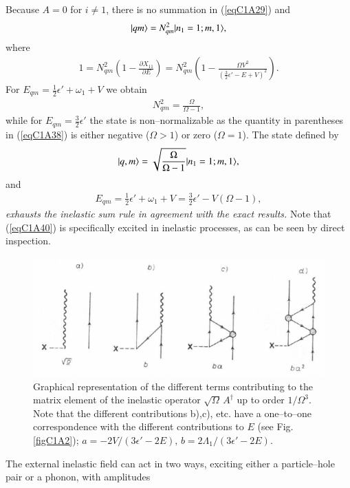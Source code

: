 Because $A=0$ for $i\neq 1$, there is no summation in (\ref{eqC1A29}) and
 \begin{align}\label{eqC1A37} 
|{qm} \rangle=N^2_{qm}|{n_1=1;m,1} \rangle,
 \end{align}
where
 \begin{align}\label{eqC1A38} 
1=N^2_{qm}\left(1-\frac{\partial X_{11}}{\partial E}\right)=N^2_{qm}\left(1-\frac{\Omega V^2}{\left(\frac{3}{2}\epsilon'-E+V\right)^2}\right).
 \end{align}
For $E_{qm}=\frac{1}{2}\epsilon'+\omega_1+V$ we obtain
 \begin{align}\label{eqC1A39} 
 N^2_{qm}=\frac{\Omega}{\Omega-1},
 \end{align}
while for $E_{qm}=\frac{3}{2}\epsilon'$ the state is non--normalizable as the quantity in parentheses
in (\ref{eqC1A38}) is either negative ($\Omega>1$) or zero ($\Omega=1$).
The state defined by
 \begin{align}\label{eqC1A40} 
|{q,m} \rangle=\sqrt{\frac{\Omega}{\Omega-1}}|{n_1=1;m,1} \rangle,
 \end{align}
and 
 \begin{align}\label{eqC1A41} 
E_{qm}=\frac{1}{2}\epsilon'+\omega_1+V=\frac{3}{2}\epsilon'-V(\Omega-1),
 \end{align}
\textit{exhausts the inelastic sum rule in agreement with the exact results.} Note
that (\ref{eqC1A40}) is specifically excited in inelastic processes, as can be seen by
direct inspection.
  \begin{figure}
  \centerline {
  \includegraphics*[width=12cm]{introduccion/figs/fig20}
  }
  \caption{Graphical representation of the different terms contributing to the matrix element of the inelastic operator $\sqrt{\Omega}\,A^\dagger$ up to order $1/\Omega^3$. Note that the different contributions b),c), etc. have a one--to--one correspondence with the different contributions to $E$ (see Fig. \ref{figC1A2}); $a=-2V/(3\epsilon'-2E),\,b=2\Lambda_1/(3\epsilon'-2E)$.}
  \label{figC1A3}
  \end{figure}
The external inelastic field can act in two ways, exciting either a particle--hole pair or a phonon, with amplitudes 
